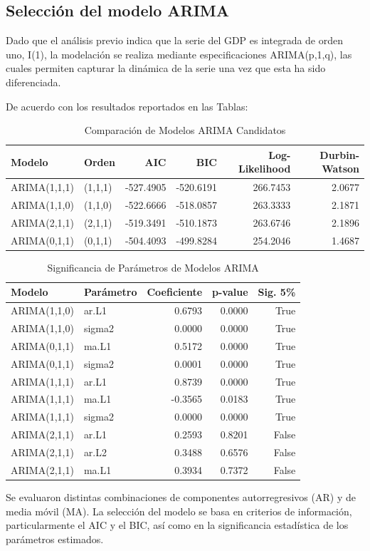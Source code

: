 \documentclass[11pt,a4paper]{article}
\begin{document}
	\subsection{Selección del modelo ARIMA}
	Dado que el análisis previo indica que la serie del GDP es integrada de orden uno, I(1), la modelación se realiza mediante especificaciones ARIMA(p,1,q), las cuales permiten capturar la dinámica de la serie una vez que esta ha sido diferenciada.
	
	De acuerdo con los resultados reportados en las Tablas:
	\begin{table}[H]
		\centering
		\caption{Comparación de Modelos ARIMA Candidatos}
		\label{tab:arima}
		
		\small
		
		\begin{tabular}{llrrrr}
			\toprule
			Modelo & Orden & AIC &	BIC & Log-Likelihood &	Durbin-Watson \\
			\midrule			
			ARIMA(1,1,1) &(1,1,1) &-527.4905 &-520.6191 &266.7453 &2.0677 \\			
			ARIMA(1,1,0) &(1,1,0) &-522.6666 &-518.0857 &263.3333 &	2.1871 \\			
			ARIMA(2,1,1) &(2,1,1) &-519.3491 &-510.1873 &263.6746 &	2.1896 \\			
			ARIMA(0,1,1) &(0,1,1) &-504.4093 &-499.8284 &254.2046 &	1.4687 \\			
			\bottomrule
		\end{tabular}
	\end{table}
	\begin{table}[H]
		\centering
		\caption{Significancia de Parámetros de Modelos ARIMA}
		\label{tab:significancia_arima}		
		\small		
		\begin{tabular}{llrrr}
			\toprule
			Modelo &Parámetro &Coeficiente &p-value &Sig. 5\% \\
			\midrule			
			ARIMA(1,1,0) &ar.L1 &0.6793 &0.0000 &True \\			
			ARIMA(1,1,0) &sigma2 &0.0000 &0.0000 &True \\			
			ARIMA(0,1,1) &ma.L1 &0.5172 &0.0000 &True \\			
			ARIMA(0,1,1) &sigma2 &0.0001 &0.0000 &True \\			
			ARIMA(1,1,1) &ar.L1 &0.8739 &0.0000 &True \\			
			ARIMA(1,1,1) &ma.L1 &-0.3565 &0.0183 &True \\			
			ARIMA(1,1,1) &sigma2 &0.0000 &0.0000 &True \\			
			ARIMA(2,1,1) &ar.L1 &0.2593 &0.8201 &False \\			
			ARIMA(2,1,1) &ar.L2 &0.3488 &0.6576 &False \\			
			ARIMA(2,1,1) &ma.L1 &0.3934 &0.7372 &False \\			
			\bottomrule
		\end{tabular}
	\end{table}
	Se evaluaron distintas combinaciones de componentes autorregresivos (AR) y de media móvil (MA). La selección del modelo se basa en criterios de información, particularmente el AIC y el BIC, así como en la significancia estadística de los parámetros estimados.
	
\end{document}
